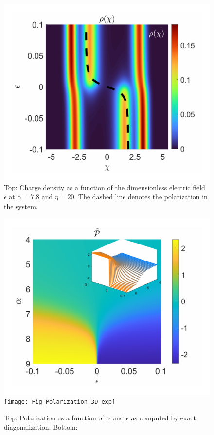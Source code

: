 \documentclass[prb,twocolumn,showpacs,preprintnumbers,amsmath,amssymb, superscriptaddress]{revtex4-2}
\newcommand{\1}{{1\hspace*{-0.5ex} \textrm{l} \hspace*{0.5ex}}}
\begin{document}
\begin{figure}[h!]
	\begin{center}
		\includegraphics[width=1\columnwidth]{Fig_Polarization_2D}
		
		\caption{Top: Charge density as a function of the dimensionless electric field $\epsilon$ at $\alpha = 7.8$ and $\eta = 20$. The dashed line denotes the polarization in the system.}
	\end{center}
\end{figure}


\begin{figure}
	\begin{center}
	\includegraphics[width=1\columnwidth]{Fig_Polarization_3D_theor}
	\texttt{[image: Fig\_Polarization\_3D\_exp]}
     \caption{Top: Polarization as a function of $\alpha$ and $\epsilon$ as computed by exact diagonalization. Bottom:}
	\end{center}
\end{figure}
\end{document}

